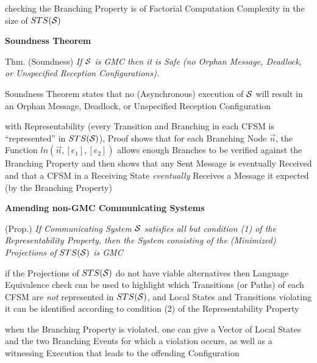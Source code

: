 checking the Branching Property is of Factorial Computation Complexity
in the size of $STS(\mathcal{S})$


\textbf{Soundness Theorem}

Thm. (Soundness) \emph{If $\mathcal{S}$ is GMC then it is
  \emph{Safe} (no Orphan Message, Deadlock, or Unspecified Reception
  Configurations).}

Soundness Theorem states that no (Asynchronous) execution of
$\mathcal{S}$ will result in an Orphan Message, Deadlock, or Unspecified
Reception Configuration

with Representability (every Transition and Branching in each CFSM is
``represented'' in $STS(\mathcal{S})$), Proof shows that for each
Branching Node $\vec{n}$, the Function $ln(\vec{n},[e_1],[e_2])$
allows enough Branches to be verified against the Branching Property
and then shows that any Sent Message is eventually Received and that a
CFSM in a Receiving State \emph{eventually} Receives a Message it
expected (by the Branching Property)


\textbf{Amending non-GMC Communicating Systems}

(Prop.) \emph{If Communicating System $\mathcal{S}$ satisfies all but
condition (1) of the Representability Property, then the System
consisting of the (Minimized) Projections of $STS(\mathcal{S})$ is GMC}

if the Projections of $STS(\mathcal{S})$ do not have viable alternatives
then Language Equivalence check can be used to highlight which
Transitions (or Paths) of each CFSM are \emph{not} represented in
$STS(\mathcal{S})$, and Local States and Transitions violating it can be
identified according to condition (2) of the Representability Property

when the Branching Property is violated, one can give a Vector of
Local States and the two Branching Events for which a violation
occurs, as well as a witnessing Execution that leads to the offending
Configuration

